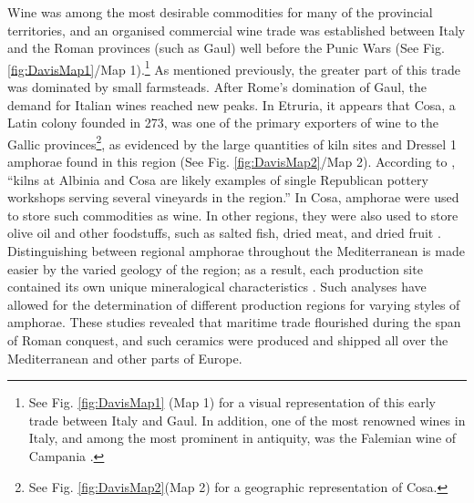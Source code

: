 
Wine was among the most desirable commodities for many of the provincial territories, and an organised commercial wine trade was established between Italy and the Roman provinces (such as Gaul) well before the Punic Wars \parencites[145]{Kay_2014}[163]{Kron_2012}[7]{Purcell_1985}(See Fig. \ref{fig:DavisMap1}/Map 1).\footnote{See Fig. \ref{fig:DavisMap1} (Map 1) for a visual representation of this early trade between Italy and Gaul. In addition, one of the most renowned wines in Italy, and among the most prominent in antiquity, was the Falemian wine of Campania \parencite[22]{Moore_1995}.} As mentioned previously, the greater part of this trade was dominated by small farmsteads. After Rome’s domination of Gaul, the demand for Italian wines reached new peaks. In Etruria, it appears that Cosa, a Latin colony founded in 273\BC, was one of the primary exporters of wine to the Gallic provinces\footnote{See Fig. \ref{fig:DavisMap2}(Map 2) for a geographic representation of Cosa.}, as evidenced by the large quantities of kiln sites and Dressel 1 amphorae found in this region (See Fig. \ref{fig:DavisMap2}/Map 2). According to \textcite[51]{Moore_1995}, “kilns at Albinia and Cosa are likely examples of single Republican pottery workshops serving several vineyards in the region.” 
In Cosa, amphorae were used to store such commodities as wine. In other regions, they were also used to store olive oil and other foodstuffs, such as salted fish, dried meat, and dried fruit \parencite[80]{Amadori_2002}. Distinguishing between regional amphorae throughout the Mediterranean is made easier by the varied geology of the region; as a result, each production site contained its own unique mineralogical characteristics \parencites{Olcese_2005}[262]{Peacock_1977}. Such analyses have allowed for the determination of different production regions for varying styles of amphorae. These studies revealed that maritime trade flourished during the span of Roman conquest, and such ceramics were produced and shipped all over the Mediterranean and other parts of Europe. 



